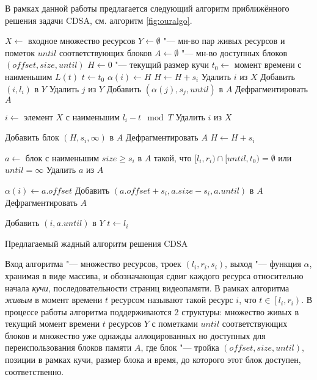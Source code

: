 В рамках данной работы предлагается следующий алгоритм приближённого решения задачи CDSA, см. алгоритм \ref{fig:ouralgo}.
\begin{algorithm}
\begin{algorithmic}[1]
\State $X \gets$ входное множество ресурсов
\State $Y \gets \emptyset$ "--- мн-во пар живых ресурсов и пометок $until$ соответствующих блоков
\State $A \gets \emptyset$ "--- мн-во доступных блоков $(offset, size, until)$
\State $H \gets 0$ "--- текущий размер кучи
\State $t_0 \gets$ момент времени с наименьшим $L(t)$
\State $t \gets t_0$
    \State $\alpha(i) \gets H$
    \State $H \gets H + s_i$
    \State Удалить $i$ из $X$
    \State Добавить $(i, l_i)$ в $Y$
\EndFor
\Repeat
            \State Удалить $j$ из $Y$
            \State Добавить $(\alpha(j), s_j, until)$ в $A$
            \State Дефрагментировать $A$
        \EndIf
    \EndFor

    \State $i \gets$ элемент $X$ с наименьшим $l_i - t \mod T$
    \State Удалить $i$ из $X$

        \State Добавить блок $(H, s_i, \infty)$ в $A$
        \State Дефрагментировать $A$
        \State $H \gets H + s_i$
    \EndIf

    \State $a \gets$ блок с наименьшим $size \geqslant s_i$ в $A$ такой, что $[l_i, r_i) \cap [until, t_0) = \emptyset$ или $until = \infty$
    \State Удалить $a$ из $A$

    \State $\alpha(i) \gets a.offset$
        \State Добавить $(a.offset + s_i, a.size - s_i, a.until)$ в $A$
        \State Дефрагментировать $A$
    \EndIf

    \State Добавить $\left(i, a.until\right)$ в $Y$
    \State $t \gets l_i$
\end{algorithmic}
\caption{Предлагаемый жадный алгоритм решения CDSA}
\label{fig:ouralgo}
\end{algorithm}
Вход алгоритма "--- множество ресурсов, троек $(l_i, r_i, s_i)$, выход "--- функция $\alpha$, хранимая в виде массива, и обозначающая сдвиг каждого ресурса относительно начала \textit{кучи}, последовательности страниц видеопамяти.
В рамках алгоритма \textit{живым} в момент времени $t$ ресурсом называют такой ресурс $i$, что $t \in \left[l_i, r_i\right)$.
В процессе работы алгоритма поддерживаются 2 структуры: множество живых в текущий момент времени $t$ ресурсов $Y$ с пометками $until$ соответствующих блоков и множество уже однажды аллоцированных но доступных для переиспользования блоков памяти $A$, где блок "--- тройка $(offset, size, until)$, позиции в рамках кучи, размер блока и время, до которого этот блок доступен, соответственно.
